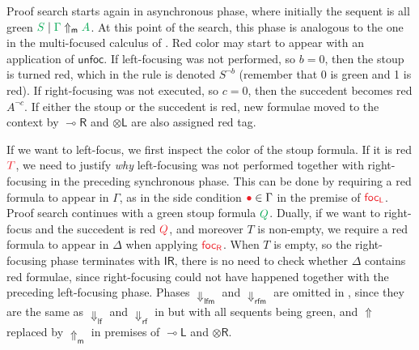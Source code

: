 \documentclass[runningheads]{llncs}
\newcommand{\tl}{\otimes \mathsf{L}}
\newcommand{\tr}{\otimes \mathsf{R}}
\newcommand{\lright}{{\multimap}\mathsf{R}}
\newcommand{\lleft}{{\multimap}\mathsf{L}}
\newcommand{\pass}{\mathsf{pass}}
\newcommand{\unitr}{\mathsf{IR}}
\newcommand{\otL}{\tl}
\newcommand{\otR}{\tr}
\newcommand{\lolliR}{\lright}
\newcommand{\lolliL}{\lleft}
\newcommand{\IR}{\unitr}
\newcommand{\lfm}{\dn_\mathsf{lfm}}%
\newcommand{\rfm}{\dn_\mathsf{rfm}}%
\newcommand{\lf}{\dn_\mathsf{lf}}%
\newcommand{\rf}{\dn_\mathsf{rf}}%
\newcommand{\red}[1]{{\color{Red}#1}}
\newcommand{\green}[1]{{\color{Green}#1}}
\newcommand{\up}{\Uparrow}
\newcommand{\dn}{\Downarrow}
\newcommand{\upm}{\Uparrow_{\mathsf{m}}}
\newcommand{\focL}{\mathsf{foc_L}}
\newcommand{\focR}{\mathsf{foc_R}}
\newcommand{\unfoc}{\mathsf{unfoc}}
\begin{document}
Proof search starts again in asynchronous phase, where initially the sequent is all green $\green{S} \mid \green{\Gamma} \upm \green{A}$. At this point of the search, this phase is analogous to the one in the multi-focused calculus of . Red color may start to appear with an application of $\unfoc$. If left-focusing was not performed, so $b = 0$, then the stoup is turned red, which in the rule is denoted $S^{\neg b}$ (remember that 0 is green and 1 is red). If right-focusing was not executed, so $c = 0$, then the succedent becomes red $A^{\neg c}$. If either the stoup or the succedent is red, new formulae moved to the context by $\lolliR$ and $\otL$ are also assigned red tag.

If we want to left-focus, we first inspect the color of the stoup formula. If it is red $\red{T}$, we need to justify \emph{why} left-focusing was not performed together with right-focusing in the preceding synchronous phase. This can be done by requiring a red formula to appear in $\Gamma$, as in the side condition $\red{\bullet} \in \Gamma$ in the premise of $\red{\focL}$. Proof search continues with a green stoup formula $\green{Q}$. Dually, if we want to right-focus and the succedent is red $\red{Q}$, and moreover $T$ is non-empty, we require a red formula to appear in $\Delta$ when applying $\red{\focR}$. When $T$ is empty, so the right-focusing phase terminates with $\IR$, there is no need to check whether $\Delta$ contains red formulae, since right-focusing could not have happened together with the preceding left-focusing phase. Phases $\lfm$ and $\rfm$ are omitted in , since they are the same as $\lf$ and $\rf$ in  but with all sequents being green, and $\up$ replaced by $\upm$ in premises of $\lolliL$ and $\otR$.

\end{document}
